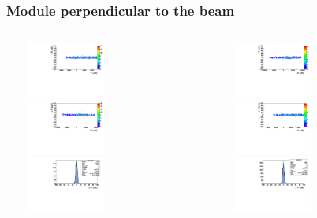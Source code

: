\documentclass{beamer}
\begin{document}
\begin{frame}
  \frametitle{Module perpendicular to the beam}

  \vspace{-0.2cm}

  \vspace{-0.2cm}
  \begin{center}
    \begin{columns}[t]
      \begin{column}{4cm}
        \centering
        \includegraphics[width = 4cm, height = 1.8cm]{Pictures/deltaUV_6_normal_incidence.pdf}
        \
        \includegraphics[width = 4cm, height = 1.8cm]{Pictures/deltaUU_6_normal_incidence.pdf}
        \
        \includegraphics[width = 4cm, height = 1.8cm]{Pictures/deltaU_6_normal_incidence.pdf}
      \end{column}
      \begin{column}{4cm}
        \centering
        \includegraphics[width = 4cm, height = 1.8cm]{Pictures/deltaVU_6_normal_incidence.pdf}
        \
        \includegraphics[width = 4cm, height = 1.8cm]{Pictures/deltaVV_6_normal_incidence.pdf}
        \
        \includegraphics[width = 4cm, height = 1.8cm]{Pictures/deltaV_6_normal_incidence.pdf}
      \end{column}
    \end{columns}
  \end{center}


\end{frame}
\end{document}
